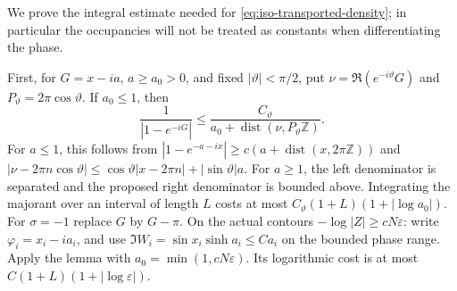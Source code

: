 \documentclass[11pt]{article}
\numberwithin{equation}{section}
\theoremstyle{definition}
\newcommand{\eps}{\varepsilon}
\begin{document}
We prove the integral estimate needed for
\eqref{eq:iso-transported-density}; in particular the occupancies
will not be treated as constants when differentiating the phase.

First, for $G=x-ia$, $a\ge a_0>0$, and fixed
$|\vartheta|<\pi/2$, put $\nu=\Re(e^{-i\vartheta}G)$ and
$P_\vartheta=2\pi\cos\vartheta$.  If $a_0\le1$, then
\begin{equation}\label{eq:iso-oblique-kernel}
 \frac1{|1-e^{-iG}|}
 \le\frac{C_\vartheta}
 {a_0+\operatorname{dist}(\nu,P_\vartheta\mathbb Z)}.
\end{equation}
For $a\le1$, this follows from
$|1-e^{-a-ix}|\ge c(a+\operatorname{dist}(x,2\pi\mathbb Z))$
and
$|\nu-2\pi n\cos\vartheta|\le
 \cos\vartheta|x-2\pi n|+|\sin\vartheta|a$.
For $a\ge1$, the left denominator is separated and the proposed
right denominator is bounded above.  Integrating the majorant over
an interval of length $L$ costs at most
$C_\vartheta(1+L)(1+|\log a_0|)$.  For $\sigma=-1$ replace $G$
by $G-\pi$.  On the actual contours $-\log|Z|\ge cN\eps$:
write $\varphi_i=x_i-ia_i$, and use
$\Im W_i=\sin x_i\sinh a_i\le Ca_i$ on the bounded phase range.
Apply the lemma with $a_0=\min(1,cN\eps)$.  Its logarithmic cost is
at most $C(1+L)(1+|\log\eps|)$.
\end{document}
